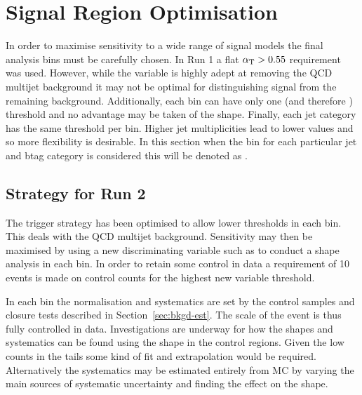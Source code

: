 
\chapter{Signal Region Optimisation} %

\label{Chapter3} %



In order to maximise sensitivity to a wide range of signal models 
the final analysis bins must be carefully chosen. 
In Run 1 a flat $\alpha_{\text{T}} > 0.55$ requirement was used. However, 
while the \alphat variable is highly adept at removing the
QCD multijet background it may not be optimal for distinguishing 
signal from the remaining background. Additionally, each bin can have
only one \alphat (and therefore \mht) threshold and no advantage 
may be taken of the shape. Finally, each jet category has the same 
\alphat threshold per \scalht bin. Higher jet multiplicities lead to 
lower \alphat values and so more flexibility is desirable. 
In this section when the \scalht bin for each particular jet and btag 
category is considered this will be denoted as \scalhtcat.


\section{Strategy for Run 2}

The trigger strategy has been optimised to allow lower \alphat thresholds in each bin. 
This deals with the QCD multijet background. Sensitivity may then be maximised
by using a new discriminating variable such as \mht to conduct a shape analysis in each bin.
In order to retain some control in data a requirement of 10 events is made
on control counts for the highest new variable threshold.

In each \scalhtcat bin the normalisation and systematics are set by the control samples
and closure tests described in Section~\ref{sec:bkgd-est}. The scale of the event is
thus fully controlled in data. Investigations are underway for how the shapes 
and systematics can be found using the shape in the control regions. Given the low
counts in the tails some kind of fit and extrapolation would be required.
Alternatively the systematics may be estimated entirely from MC by varying the main 
sources of systematic uncertainty and finding the effect on the shape.



